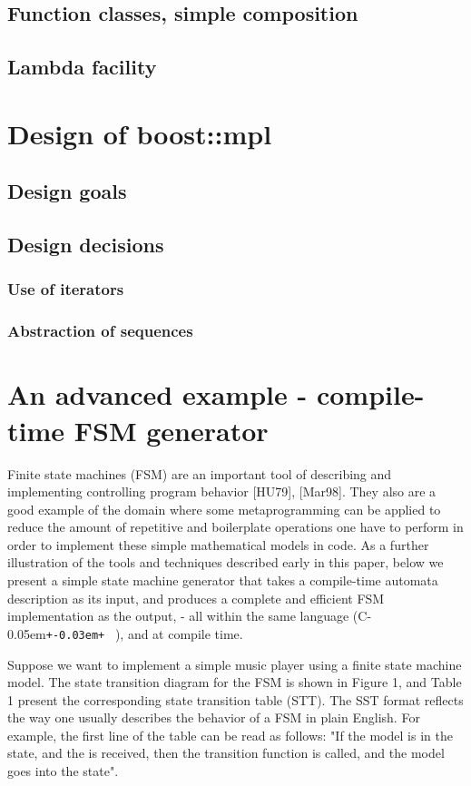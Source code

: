 \documentclass{netobjectdays}
\newcommand{\Cpp}{C\kern-0.05em\texttt{+\kern-0.03em+}%
}
\newcommand{\mping}{meta\-program\-ming}
\begin{document}
\subsection{Function classes, simple composition}
\subsection{Lambda facility}

\section{Design of boost::mpl}
\subsection{Design goals}
\subsection{Design decisions}
\subsubsection{Use of iterators}
\subsubsection{Abstraction of sequences}

\section{An advanced example - compile-time FSM generator}

Finite state machines (FSM) are an important tool of 
describing and implementing controlling program behavior 
[HU79], [Mar98]. They also are a good example of the domain 
where some \mping{} can be applied to reduce the amount of 
repetitive and boilerplate operations one have to perform 
in order to implement these simple mathematical models in 
code. As a further illustration of the tools and techniques 
described early in this paper, below we present a simple 
state machine generator that takes a compile-time automata 
description as its input, and produces a complete and 
efficient FSM implementation as the output, - all within 
the same language (\Cpp\ ), and at compile time.

Suppose we want to implement a simple music player using a 
finite state machine model. The state transition diagram for 
the FSM is shown in Figure 1, and Table 1 present the 
corresponding state transition table (STT). The SST format 
reflects the way one usually describes the behavior of a FSM 
in plain English. For example, the first line of the table 
can be read as follows: "If the model is in the 
state, and the  is received, then the 
 transition function is called, and the model 
goes into the  state".
\end{document}
